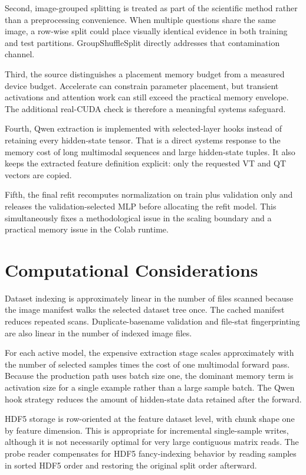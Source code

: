 \documentclass[11pt,a4paper]{article}
\begin{document}
Second, image-grouped splitting is treated as part of the scientific method rather than a preprocessing convenience. When multiple questions share the same image, a row-wise split could place visually identical evidence in both training and test partitions. GroupShuffleSplit directly addresses that contamination channel.

Third, the source distinguishes a placement memory budget from a measured device budget. Accelerate can constrain parameter placement, but transient activations and attention work can still exceed the practical memory envelope. The additional real-CUDA check is therefore a meaningful systems safeguard.

Fourth, Qwen extraction is implemented with selected-layer hooks instead of retaining every hidden-state tensor. That is a direct systems response to the memory cost of long multimodal sequences and large hidden-state tuples. It also keeps the extracted feature definition explicit: only the requested VT and QT vectors are copied.

Fifth, the final refit recomputes normalization on train plus validation only and releases the validation-selected MLP before allocating the refit model. This simultaneously fixes a methodological issue in the scaling boundary and a practical memory issue in the Colab runtime.

\section{Computational Considerations}

Dataset indexing is approximately linear in the number of files scanned because the image manifest walks the selected dataset tree once. The cached manifest reduces repeated scans. Duplicate-basename validation and file-stat fingerprinting are also linear in the number of indexed image files.

For each active model, the expensive extraction stage scales approximately with the number of selected samples times the cost of one multimodal forward pass. Because the production path uses batch size one, the dominant memory term is activation size for a single example rather than a large sample batch. The Qwen hook strategy reduces the amount of hidden-state data retained after the forward.

HDF5 storage is row-oriented at the feature dataset level, with chunk shape one by feature dimension. This is appropriate for incremental single-sample writes, although it is not necessarily optimal for very large contiguous matrix reads. The probe reader compensates for HDF5 fancy-indexing behavior by reading samples in sorted HDF5 order and restoring the original split order afterward.
\end{document}
